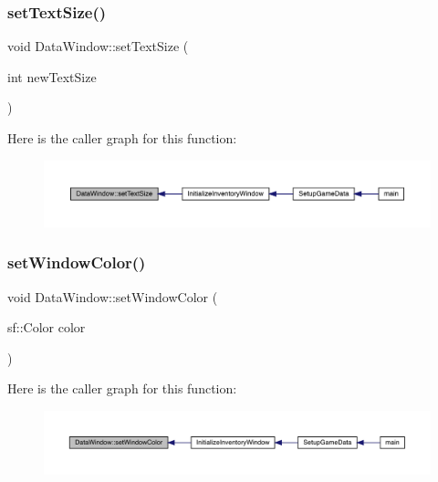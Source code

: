 \subsubsection{\texorpdfstring{set\+Text\+Size()}{setTextSize()}}
{\footnotesize\ttfamily void Data\+Window\+::set\+Text\+Size (\begin{DoxyParamCaption}\item[{int}]{new\+Text\+Size }\end{DoxyParamCaption})}

Here is the caller graph for this function\+:
\nopagebreak
\begin{figure}[H]
\begin{center}
\leavevmode
\includegraphics[width=350pt]{class_data_window_aa9fe53356b3989e0781a13a03814aaac_icgraph}
\end{center}
\end{figure}
\mbox{\label{class_data_window_ab06d2ddf751a472f8f2305084f572a4b}} 
\subsubsection{\texorpdfstring{set\+Window\+Color()}{setWindowColor()}}
{\footnotesize\ttfamily void Data\+Window\+::set\+Window\+Color (\begin{DoxyParamCaption}\item[{sf\+::\+Color}]{color }\end{DoxyParamCaption})}

Here is the caller graph for this function\+:
\nopagebreak
\begin{figure}[H]
\begin{center}
\leavevmode
\includegraphics[width=350pt]{class_data_window_ab06d2ddf751a472f8f2305084f572a4b_icgraph}
\end{center}
\end{figure}
\mbox{\label{class_data_window_ab28e270817e9cdc56c78d9723c485d8f}} 
